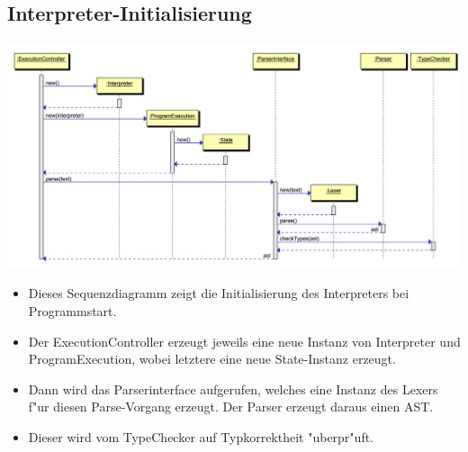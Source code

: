 \documentclass[10pt,a4paper,titlepage]{article}
\begin{document}
\subsection{Interpreter-Initialisierung}
\includegraphics[scale=0.9]{images/interpreter_init.pdf} \newline
\begin{itemize}
\item Dieses Sequenzdiagramm zeigt die Initialisierung des Interpreters bei Programmstart.
\item Der ExecutionController erzeugt jeweils eine neue Instanz von Interpreter und ProgramExecution, wobei letztere eine neue State-Instanz erzeugt.
\item Dann wird das Parserinterface aufgerufen, welches eine Instanz des Lexers f"ur diesen Parse-Vorgang erzeugt. Der Parser erzeugt daraus einen AST.
\item Dieser wird vom TypeChecker auf Typkorrektheit "uberpr"uft.
\end{itemize}
\end{document}
